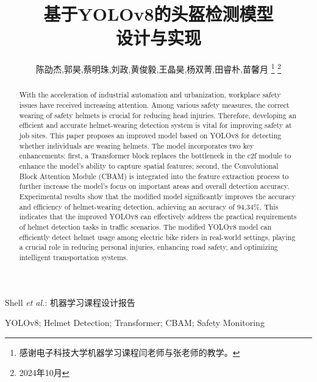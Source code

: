\documentclass[journal]{IEEEtran}
\numberwithin{figure}{section}%
\numberwithin{table}{section}%
\numberwithin{equation}{section}
\begin{document}
\title{基于YOLOv8的头盔检测模型\\设计与实现}

\author{陈劭杰,郭昊,蔡明珠,刘政,黄俊毅,王晶昊,杨双菁,田睿朴,苗馨月%
\thanks{感谢电子科技大学机器学习课程闫老师与张老师的教学。}%
\thanks{2024年10月}}


%
{Shell \MakeLowercase{\textit{et al.}}: 机器学习课程设计报告}


\maketitle

\begin{abstract}
	With the acceleration of industrial automation and urbanization, workplace safety issues have received increasing attention. Among various safety measures, the correct wearing of safety helmets is crucial for reducing head injuries. Therefore, developing an efficient and accurate helmet-wearing detection system is vital for improving safety at job sites. This paper proposes an improved model based on YOLOv8 for detecting whether individuals are wearing helmets. The model incorporates two key enhancements: first, a Transformer block replaces the bottleneck in the c2f module to enhance the model's ability to capture spatial features; second, the Convolutional Block Attention Module (CBAM) is integrated into the feature extraction process to further increase the model's focus on important areas and overall detection accuracy. Experimental results show that the modified model significantly improves the accuracy and efficiency of helmet-wearing detection, achieving an accuracy of 94.34\%. This indicates that the improved YOLOv8 can effectively address the practical requirements of helmet detection tasks in traffic scenarios. The modified YOLOv8 model can efficiently detect helmet usage among electric bike riders in real-world settings, playing a crucial role in reducing personal injuries, enhancing road safety, and optimizing intelligent transportation systems.
\end{abstract}

\begin{IEEEkeywords}
YOLOv8; Helmet Detection; Transformer; CBAM; Safety Monitoring
\end{IEEEkeywords}
\end{document}
